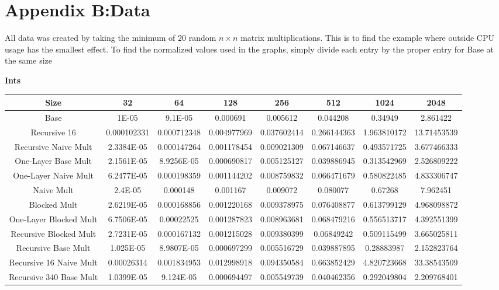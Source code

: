 \documentclass{article}         %
\begin{document}
\section*{Appendix B:Data}
All data was created by taking the minimum of $20$ random $n\times n$ matrix multiplications. This is to find the example where outside CPU usage has the smallest effect. To find the normalized values used in the graphs, simply divide each entry by the proper entry for Base at the same size\\
\begin{center}
\textbf{Ints}\\
    \begin{tabular}{|c|c c c c c c c|}
    \hline
Size & 32 & 64 & 128 & 256 & 512 & 1024 & 2048\\ 
 \hline 
Base & 1E-05 & 9.1E-05 & 0.000691 & 0.005612 & 0.044208 & 0.34949 & 2.861422\\ 
 \hline 
Recursive 16 & 0.000102331 & 0.000712348 & 0.004977969 & 0.037602414 & 0.266144363 & 1.963810172 & 13.71453539\\ 
 \hline 
Recursive Naive Mult & 2.3384E-05 & 0.000147264 & 0.001178454 & 0.009021309 & 0.067146637 & 0.493571725 & 3.677466333\\ 
 \hline 
One-Layer Base Mult & 2.1561E-05 & 8.9256E-05 & 0.000690817 & 0.005125127 & 0.039886945 & 0.313542969 & 2.526809222\\ 
 \hline 
One-Layer Naive Mult & 6.2477E-05 & 0.000198359 & 0.001144202 & 0.008759832 & 0.066471679 & 0.580822485 & 4.833306747\\ 
 \hline 
Naive Mult & 2.4E-05 & 0.000148 & 0.001167 & 0.009072 & 0.080077 & 0.67268 & 7.962451\\ 
 \hline 
Blocked Mult & 2.6219E-05 & 0.000168856 & 0.001220168 & 0.009378975 & 0.076408877 & 0.613799129 & 4.968098872\\ 
 \hline 
One-Layer Blocked Mult & 6.7506E-05 & 0.00022525 & 0.001287823 & 0.008963681 & 0.068479216 & 0.556513717 & 4.392551399\\ 
 \hline 
Recursive Blocked Mult & 2.7231E-05 & 0.000167132 & 0.001215028 & 0.009380399 & 0.06849242 & 0.509115499 & 3.665025811\\ 
 \hline 
Recursive Base Mult & 1.025E-05 & 8.9807E-05 & 0.000697299 & 0.005516729 & 0.039887895 & 0.28883987 & 2.152823764\\ 
 \hline 
Recursive 16 Naive Mult & 0.00026314 & 0.001834953 & 0.012998918 & 0.094350584 & 0.663852429 & 4.820723668 & 33.38543509\\ 
 \hline 
Recursive 340 Base Mult & 1.0399E-05 & 9.124E-05 & 0.000694497 & 0.005549739 & 0.040462356 & 0.292049804 & 2.209768401\\ 
\hline




\end{tabular}
\end{center}
\end{document}
